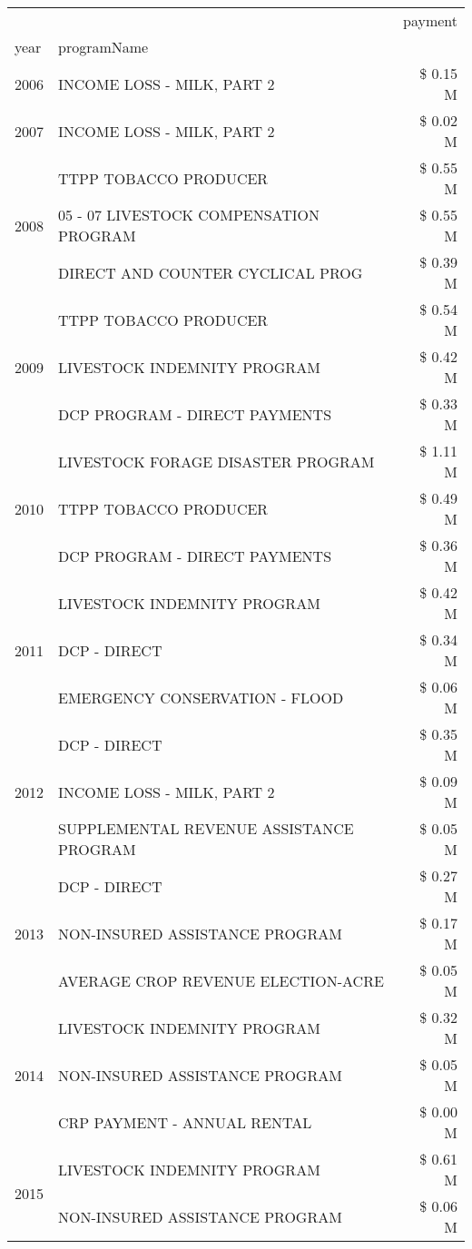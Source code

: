\begin{tabular}{llr}
\toprule
 &  & payment \\
year & programName &  \\
\midrule
2006 & INCOME LOSS - MILK, PART 2 & \$ 0.15 M \\
\cline{1-3}
2007 & INCOME LOSS - MILK, PART 2 & \$ 0.02 M \\
\cline{1-3}
\multirow[t]{3}{*}{2008} & TTPP TOBACCO PRODUCER & \$ 0.55 M \\
 & 05 - 07 LIVESTOCK COMPENSATION PROGRAM & \$ 0.55 M \\
 & DIRECT AND COUNTER CYCLICAL PROG & \$ 0.39 M \\
\cline{1-3}
\multirow[t]{3}{*}{2009} & TTPP TOBACCO PRODUCER & \$ 0.54 M \\
 & LIVESTOCK INDEMNITY PROGRAM & \$ 0.42 M \\
 & DCP PROGRAM - DIRECT PAYMENTS & \$ 0.33 M \\
\cline{1-3}
\multirow[t]{3}{*}{2010} & LIVESTOCK FORAGE DISASTER  PROGRAM & \$ 1.11 M \\
 & TTPP TOBACCO PRODUCER & \$ 0.49 M \\
 & DCP PROGRAM - DIRECT PAYMENTS & \$ 0.36 M \\
\cline{1-3}
\multirow[t]{3}{*}{2011} & LIVESTOCK INDEMNITY PROGRAM & \$ 0.42 M \\
 & DCP - DIRECT & \$ 0.34 M \\
 & EMERGENCY CONSERVATION - FLOOD & \$ 0.06 M \\
\cline{1-3}
\multirow[t]{3}{*}{2012} & DCP - DIRECT & \$ 0.35 M \\
 & INCOME LOSS - MILK, PART 2 & \$ 0.09 M \\
 & SUPPLEMENTAL REVENUE ASSISTANCE PROGRAM & \$ 0.05 M \\
\cline{1-3}
\multirow[t]{3}{*}{2013} & DCP - DIRECT & \$ 0.27 M \\
 & NON-INSURED ASSISTANCE PROGRAM & \$ 0.17 M \\
 & AVERAGE CROP REVENUE ELECTION-ACRE & \$ 0.05 M \\
\cline{1-3}
\multirow[t]{3}{*}{2014} & LIVESTOCK INDEMNITY PROGRAM & \$ 0.32 M \\
 & NON-INSURED ASSISTANCE PROGRAM & \$ 0.05 M \\
 & CRP PAYMENT - ANNUAL RENTAL & \$ 0.00 M \\
\cline{1-3}
\multirow[t]{3}{*}{2015} & LIVESTOCK INDEMNITY PROGRAM & \$ 0.61 M \\
 & NON-INSURED ASSISTANCE PROGRAM & \$ 0.06 M \\

\end{tabular}
